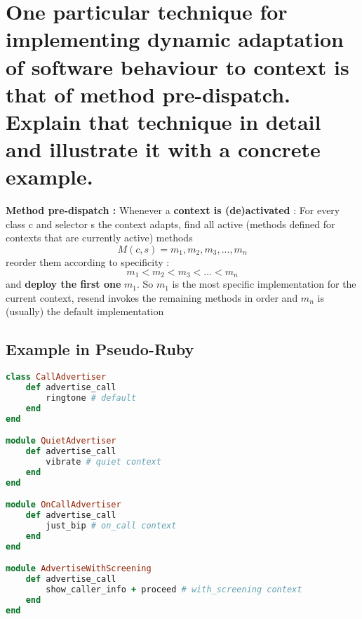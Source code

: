 \section{One particular technique for implementing dynamic adaptation of software behaviour to
context is that of method pre-dispatch. Explain that technique in detail and illustrate it with a
concrete example.}

\textbf{Method pre-dispatch : }
Whenever a \textbf{context is (de)activated} : For every class c and selector s the context adapts, find all active (methods defined for contexts that are currently active) methods $$M(c, s)={ m_1 , m_2 , m_3 , ..., m_n  }$$
reorder them according to specificity :
$$m_1  < m_2  < m_3  < ... < m_n$$
and \textbf{deploy the first one} $m_1$.
So $m_1$ is the most specific implementation for the current context, resend invokes the remaining methods in order and $m_n$ is (usually) the default implementation



\subsection{Example in Pseudo-Ruby}
\begin{lstlisting}[language=Ruby]
class CallAdvertiser
    def advertise_call
        ringtone # default
    end
end

module QuietAdvertiser
    def advertise_call
        vibrate # quiet context
    end
end

module OnCallAdvertiser
    def advertise_call
        just_bip # on_call context
    end
end

module AdvertiseWithScreening
    def advertise_call
        show_caller_info + proceed # with_screening context
    end
end
\end{lstlisting}

